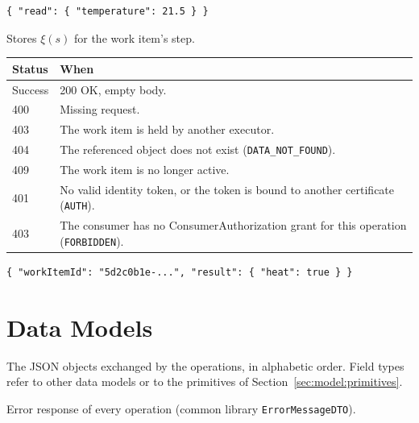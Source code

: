 \documentclass[a4paper]{arrowhead}
\begin{document}
\begin{lstlisting}[caption={Example response body}]
{ "read": { "temperature": 21.5 } }
\end{lstlisting}

Stores $\xi(s)$ for the work item's step.

{\small
\begin{longtable}{|p{2.0cm}|p{13.8cm}|}

\hline
\rowcolor{gray!33} Status & When \\ \hline
\endhead
Success & 200 OK, empty body. \\ \hline
400 & Missing request. \\ \hline
403 & The work item is held by another executor. \\ \hline
404 & The referenced object does not exist (\texttt{DATA\_\allowbreak{}NOT\_\allowbreak{}FOUND}). \\ \hline
409 & The work item is no longer active. \\ \hline
401 & No valid identity token, or the token is bound to another certificate (\texttt{AUTH}). \\ \hline
403 & The consumer has no ConsumerAuthorization grant for this operation (\texttt{FORBIDDEN}). \\ \hline
\end{longtable}
}


\begin{lstlisting}[caption={Example request body}]
{ "workItemId": "5d2c0b1e-...", "result": { "heat": true } }
\end{lstlisting}


\newpage
\section{Data Models}
\label{sec:model}
The JSON objects exchanged by the operations, in alphabetic order. Field types refer to other data models or to the
primitives of Section~\ref{sec:model:primitives}.

Error response of every operation (common library \texttt{Error\allowbreak{}MessageDTO}).
\end{document}
